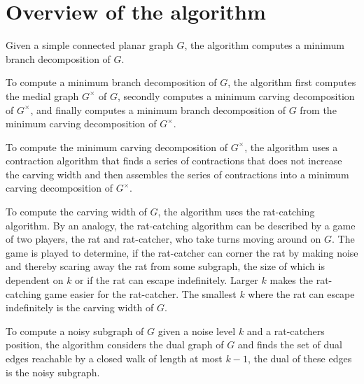 \documentclass{article}
\begin{document}

\section{Overview of the algorithm}

	Given a simple connected planar graph $G$, the algorithm computes a minimum branch decomposition of $G$.

	To compute a minimum branch decomposition of $G$, the algorithm first computes the medial graph $G^\times$ of $G$, secondly computes a minimum carving decomposition of $G^\times$, and finally computes a minimum branch decomposition of $G$ from the minimum carving decomposition of $G^\times$.

	To compute the minimum carving decomposition of $G^\times$, the algorithm uses a contraction algorithm that finds a series of contractions that does not increase the carving width and then assembles the series of contractions into a minimum carving decomposition of $G^\times$.

	To compute the carving width of $G$, the algorithm uses the rat-catching algorithm. By an analogy, the rat-catching algorithm can be described by a game of two players, the rat and rat-catcher, who take turns moving around on $G$. The game is played to determine, if the rat-catcher can corner the rat by making noise and thereby scaring away the rat from some subgraph, the size of which is dependent on $k$ or if the rat can escape indefinitely. Larger $k$ makes the rat-catching game easier for the rat-catcher. The smallest $k$ where the rat can escape indefinitely is the carving width of $G$.

	To compute a noisy subgraph of $G$ given a noise level $k$ and a rat-catchers position, the algorithm considers the dual graph of $G$ and finds the set of dual edges reachable by a closed walk of length at most $k-1$, the dual of these edges is the noisy subgraph.
\end{document}
